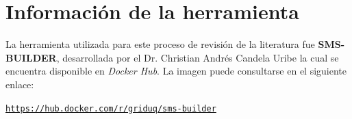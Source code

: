 \section{Información de la herramienta}

La herramienta utilizada para este proceso de revisión de la literatura fue \textbf{SMS-BUILDER}, desarrollada por el Dr. Christian Andrés Candela Uribe la cual se encuentra disponible en \textit{Docker Hub}. La imagen puede consultarse en el siguiente enlace:

\begin{center}
	\href{https://hub.docker.com/r/griduq/sms-builder}{\texttt{https://hub.docker.com/r/griduq/sms-builder}}
\end{center}
